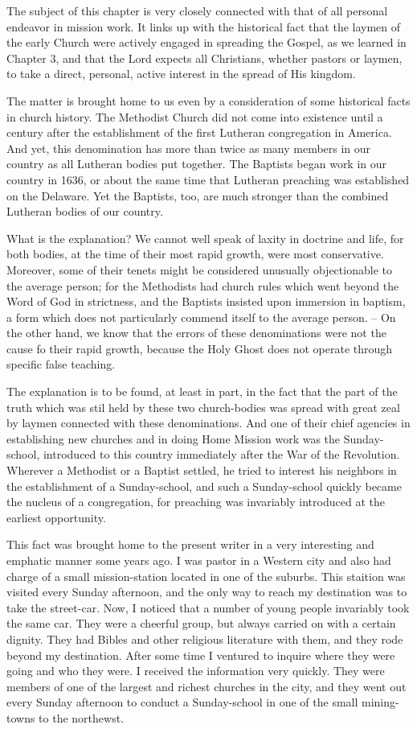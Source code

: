 \documentclass[
]{book}
\begin{document}
The subject of this chapter is very closely connected with that of all personal endeavor in mission work. It links up with the historical fact that the laymen of the early Church were actively engaged in spreading the Gospel, as we learned in Chapter 3, and that the Lord expects all Christians, whether pastors or laymen, to take a direct, personal, active interest in the spread of His kingdom.

The matter is brought home to us even by a consideration of some historical facts in church history. The Methodist Church did not come into existence until a century after the establishment of the first Lutheran congregation in America. And yet, this denomination has more than twice as many members in our country as all Lutheran bodies put together. The Baptists began work in our country in 1636, or about the same time that Lutheran preaching was established on the Delaware. Yet the Baptists, too, are much stronger than the combined Lutheran bodies of our country.

What is the explanation? We cannot well speak of laxity in doctrine and life, for both bodies, at the time of their most rapid growth, were most conservative. Moreover, some of their tenets might be considered unusually objectionable to the average person; for the Methodists had church rules which went beyond the Word of God in strictness, and the Baptists insisted upon immersion in baptism, a form which does not particularly commend itself to the average person. -- On the other hand, we know that the errors of these denominations were not the cause fo their rapid growth, because the Holy Ghost does not operate through specific false teaching.

The explanation is to be found, at least in part, in the fact that the part of the truth which was stil held by these two church-bodies was spread with great zeal by laymen connected with these denominations. And one of their chief agencies in establishing new churches and in doing Home Mission work was the Sunday-school, introduced to this country immediately after the War of the Revolution. Wherever a Methodist or a Baptist settled, he tried to interest his neighbors in the establishment of a Sunday-school, and such a Sunday-school quickly became the nucleus of a congregation, for preaching was invariably introduced at the earliest opportunity.

This fact was brought home to the present writer in a very interesting and emphatic manner some years ago. I was pastor in a Western city and also had charge of a small mission-station located in one of the suburbs. This staition was visited every Sunday afternoon, and the only way to reach my destination was to take the street-car. Now, I noticed that a number of young people invariably took the same car. They were a cheerful group, but always carried on with a certain dignity. They had Bibles and other religious literature with them, and they rode beyond my destination. After some time I ventured to inquire where they were going and who they were. I received the information very quickly. They were members of one of the largest and richest churches in the city, and they went out every Sunday afternoon to conduct a Sunday-school in one of the small mining-towns to the northewst.
\end{document}
